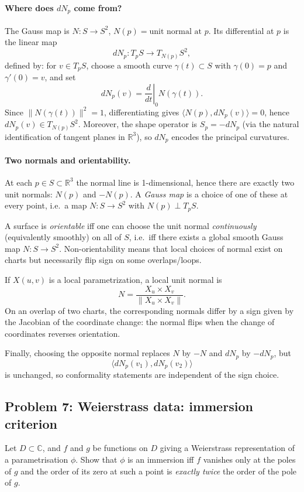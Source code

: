 \documentclass[12pt,a4paper]{article}
\theoremstyle{plain}
\theoremstyle{definition}      %
\begin{document}
	
	\paragraph{Where does $dN_p$ come from?}
	The Gauss map is $N:S\to S^2$, $N(p)=\text{unit normal at }p$.
	Its differential at $p$ is the linear map
	\[
	dN_p:T_pS\to T_{N(p)}S^2,
	\]
	defined by: for $v\in T_pS$, choose a smooth curve $\gamma(t)\subset S$ with
	$\gamma(0)=p$ and $\gamma'(0)=v$, and set
	\[
	dN_p(v)=\left.\frac{d}{dt}\right|_{0}N(\gamma(t)).
	\]
	Since $\|N(\gamma(t))\|^2=1$, differentiating gives
	$\langle N(p),dN_p(v)\rangle=0$, hence $dN_p(v)\in T_{N(p)}S^2$.
	Moreover, the shape operator is $S_p=-dN_p$ (via the natural identification of tangent planes in $\mathbb{R}^3$),
	so $dN_p$ encodes the principal curvatures.
	
	\paragraph{Two normals and orientability.}
	At each $p\in S\subset\mathbb{R}^3$ the normal line is 1-dimensional, hence there are exactly two unit normals:
	$N(p)$ and $-N(p)$. A \emph{Gauss map} is a choice of one of these at every point,
	i.e.\ a map $N:S\to S^2$ with $N(p)\perp T_pS$.
	
	A surface is \emph{orientable} iff one can choose the unit normal \emph{continuously} (equivalently smoothly) on all of $S$,
	i.e.\ iff there exists a global smooth Gauss map $N:S\to S^2$.
	Non-orientability means that local choices of normal exist on charts but necessarily flip sign on some overlaps/loops.
	
	If $X(u,v)$ is a local parametrization, a local unit normal is
	\[
	N=\frac{X_u\times X_v}{\|X_u\times X_v\|}.
	\]
	On an overlap of two charts, the corresponding normals differ by a sign given by the Jacobian of the coordinate change:
	the normal flips when the change of coordinates reverses orientation.
	
	Finally, choosing the opposite normal replaces $N$ by $-N$ and $dN_p$ by $-dN_p$, but
	\[
	\langle dN_p(v_1),dN_p(v_2)\rangle
	\]
	is unchanged, so conformality statements are independent of the sign choice.
	
	
	
\subsection*{Problem 7: Weierstrass data: immersion criterion}
	Let $D\subset\mathbb C$, and $f$ and $g$ be functions on $D$ giving a Weierstrass representation of a
	parametrisation $\phi$. Show that $\phi$ is an immersion iff $f$ vanishes only at the poles of $g$ and the
	order of its zero at such a point is \emph{exactly twice} the order of the pole of $g$.
	
\end{document}
